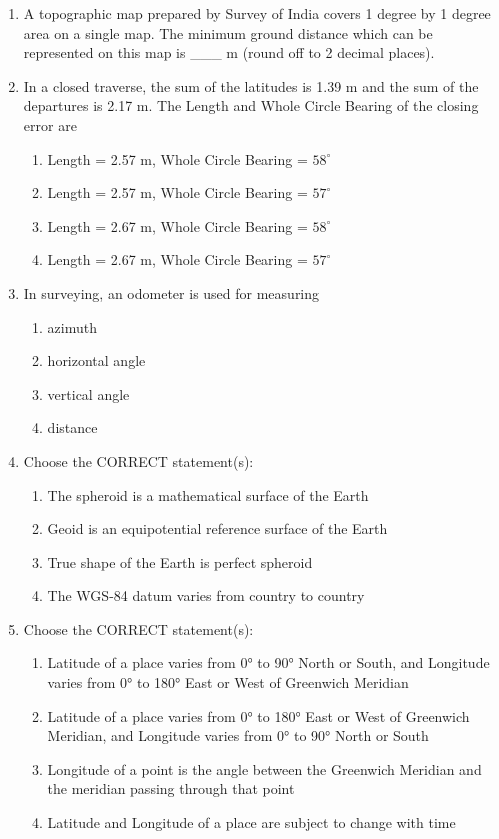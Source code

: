 \documentclass[12pt,a4paper]{article}
\begin{document}
\begin{enumerate}
\item A topographic map prepared by Survey of India covers 1 degree by 1 degree area on a single map. The minimum ground distance which can be represented on this map is \_\_\_ m (round off to 2 decimal places).

\item In a closed traverse, the sum of the latitudes is 1.39 m and the sum of the departures is 2.17 m. The Length and Whole Circle Bearing of the closing error are
\begin{enumerate}
    \item Length = 2.57 m, Whole Circle Bearing = $58^\circ$
    \item Length = 2.57 m, Whole Circle Bearing = $57^\circ$
    \item Length = 2.67 m, Whole Circle Bearing = $58^\circ$
    \item Length = 2.67 m, Whole Circle Bearing = $57^\circ$
\end{enumerate}

\item In surveying, an odometer is used for measuring
\begin{enumerate}
    \item azimuth
    \item horizontal angle
    \item vertical angle
    \item distance
\end{enumerate}

\item Choose the CORRECT statement(s):
\begin{enumerate}
    \item The spheroid is a mathematical surface of the Earth
    \item Geoid is an equipotential reference surface of the Earth
    \item True shape of the Earth is perfect spheroid
    \item The WGS-84 datum varies from country to country
\end{enumerate}

\item Choose the CORRECT statement(s):
\begin{enumerate}
    \item Latitude of a place varies from 0° to 90° North or South, and Longitude varies from 0° to 180° East or West of Greenwich Meridian
    \item Latitude of a place varies from 0° to 180° East or West of Greenwich Meridian, and Longitude varies from 0° to 90° North or South
    \item Longitude of a point is the angle between the Greenwich Meridian and the meridian passing through that point
    \item Latitude and Longitude of a place are subject to change with time
\end{enumerate}


\end{enumerate}
\end{document}
